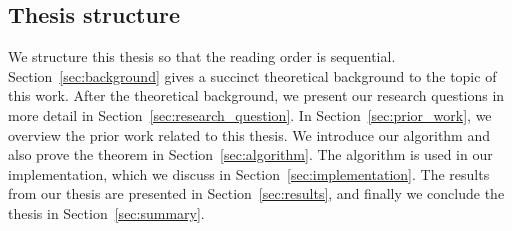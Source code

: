 \subsection{Thesis structure}
We structure this thesis so that the reading order is sequential.
Section~\ref{sec:background} gives a succinct theoretical background to the topic of this work.
After the theoretical background, we present our research questions in more detail in Section~\ref{sec:research_question}.
In Section~\ref{sec:prior_work}, we overview the prior work related to this thesis.
We introduce our algorithm and also prove the theorem in Section~\ref{sec:algorithm}.
The algorithm is used in our implementation, which we discuss in Section~\ref{sec:implementation}.
The results from our thesis are presented in Section~\ref{sec:results}, and finally we conclude the thesis in Section~\ref{sec:summary}.
